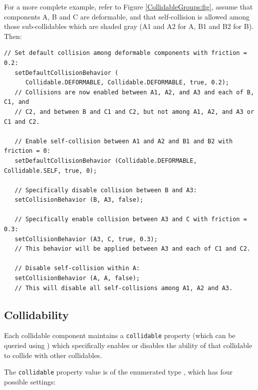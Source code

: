 For a more complete example, refer to Figure
\ref{CollidableGroups:fig}, assume that components A, B and C are
deformable, and that self-collision is allowed among those
sub-collidables which are shaded gray (A1 and A2 for A, B1 and B2 for
B). Then:
%
\begin{lstlisting}[]
   // Set default collision among deformable components with friction = 0.2:
   setDefaultCollisionBehavior (
      Collidable.DEFORMABLE, Collidable.DEFORMABLE, true, 0.2);
   // Collisions are now enabled between A1, A2, and A3 and each of B, C1, and
   // C2, and between B and C1 and C2, but not among A1, A2, and A3 or C1 and C2.

   // Enable self-collision between A1 and A2 and B1 and B2 with friction = 0:
   setDefaultCollisionBehavior (Collidable.DEFORMABLE, Collidable.SELF, true, 0);
    
   // Specifically disable collision between B and A3:
   setCollisionBehavior (B, A3, false);

   // Specifically enable collision between A3 and C with friction = 0.3:
   setCollisionBehavior (A3, C, true, 0.3);
   // This behavior will be applied between A3 and each of C1 and C2.

   // Disable self-collision within A:
   setCollisionBehavior (A, A, false);
   // This will disable all self-collisions among A1, A2 and A3.
\end{lstlisting}
%

\subsection{Collidability}
\label{collidability:sec}

Each collidable component maintains a {\tt collidable} property
(which can be queried using
)
which specifically enables or disables the ability of that collidable
to collide with other collidables.

The {\tt collidable} property value is of the enumerated type
, which
has four possible settings:

